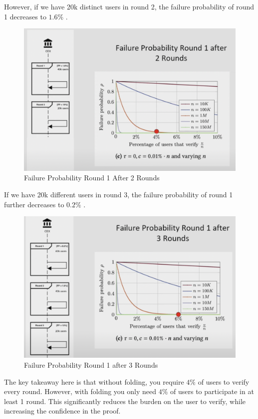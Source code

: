 However, if we have 20k distinct users in round 2, the failure probability of round 1 decreases to $1.6\%$ .


\begin{figure}[H]
   \centering
   \includegraphics[width=130mm]{FailureProbabilityRound2.png}
   \caption{Failure Probability Round 1 After 2 Rounds\cite{NS23}}
   \label{overflow}
   \end{figure}


If we have 20k different users in round 3, the failure probability of round 1 further decreases to $0.2\%$ .


\begin{figure}[H]
   \centering
   \includegraphics[width=130mm]{FailureProbabilityRound3.png}
   \caption{Failure Probability Round 1 after 3 Rounds \cite{NS23}}
   \label{overflow}
   \end{figure}
The key takeaway here is that without folding, you require $4\%$ of users to verify every round. However, with folding you only need
$4\%$  of users to participate in at least 1 round. This significantly reduces the burden on the user to verify, while increasing the confidence in the proof.


